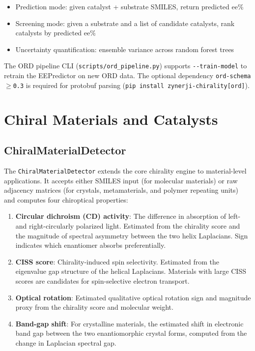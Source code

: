 \documentclass[11pt,a4paper]{article}
\begin{document}
\begin{itemize}[leftmargin=1.5em]
  \item Prediction mode: given catalyst + substrate SMILES, return predicted ee\%
  \item Screening mode: given a substrate and a list of candidate catalysts,
    rank catalysts by predicted ee\%
  \item Uncertainty quantification: ensemble variance across random forest trees
\end{itemize}

The ORD pipeline CLI (\texttt{scripts/ord\_pipeline.py}) supports
\texttt{-{}-train-model} to retrain the EEPredictor on new ORD data. The
optional dependency \texttt{ord-schema$\ge$0.3} is required for protobuf
parsing (\texttt{pip install zynerji-chirality[ord]}).

\newpage

\section{Chiral Materials and Catalysts}
\label{sec:materials}

\subsection{ChiralMaterialDetector}

The \texttt{ChiralMaterialDetector} extends the core chirality engine to
material-level applications. It accepts either SMILES input (for molecular
materials) or raw adjacency matrices (for crystals, metamaterials, and
polymer repeating units) and computes four chiroptical properties:

\begin{enumerate}[leftmargin=1.5em]
  \item \textbf{Circular dichroism (CD) activity}: The difference in absorption
    of left- and right-circularly polarized light. Estimated from the chirality
    score and the magnitude of spectral asymmetry between the two helix Laplacians.
    Sign indicates which enantiomer absorbs preferentially.
  \item \textbf{CISS score}: Chirality-induced spin selectivity. Estimated from
    the eigenvalue gap structure of the helical Laplacians. Materials with
    large CISS scores are candidates for spin-selective electron transport.
  \item \textbf{Optical rotation}: Estimated qualitative optical rotation sign
    and magnitude proxy from the chirality score and molecular weight.
  \item \textbf{Band-gap shift}: For crystalline materials, the estimated shift
    in electronic band gap between the two enantiomorphic crystal forms,
    computed from the change in Laplacian spectral gap.
\end{enumerate}
\end{document}
